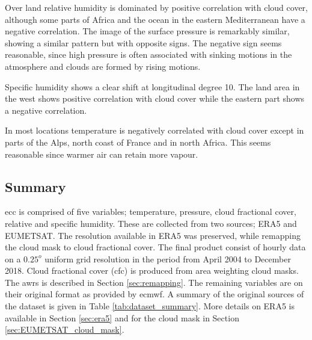Over land relative humidity is dominated by positive correlation with cloud cover, although some parts of Africa and the ocean in the eastern Mediterranean have a negative correlation. The image of the surface pressure is remarkably similar, showing a similar pattern but with opposite signs. The negative sign seems reasonable, since high pressure is often associated with sinking motions in the atmosphere and clouds are formed by rising motions. 

Specific humidity shows a clear shift at longitudinal degree 10. The land area in the west shows positive correlation with cloud cover while the eastern part shows a negative correlation. 

In most locations temperature is negatively correlated with cloud cover except in parts of the Alps, north coast of France and in north Africa. This seems reasonable since warmer air can retain more vapour.%

\subsection{Summary}
\acrshort{ecc} is comprised of five variables; temperature, pressure, cloud fractional cover, relative and specific humidity. These are collected from two sources; ERA5 and EUMETSAT. The resolution available in ERA5 was preserved, while remapping the cloud mask to cloud fractional cover. 
The final product consist of %
hourly data on a $0.25^o$ uniform grid resolution in the period from April 2004 to December 2018. Cloud fractional cover (\acrshort{cfc}) is produced from area weighting cloud masks. The \acrshort{awrs} is described in Section \ref{sec:remapping}. The remaining variables are on their original format as provided by \acrfull{ecmwf}. A summary of the original sources of the dataset is given in Table \ref{tab:dataset_summary}. More details on ERA5 is available in Section \ref{sec:era5} and for the cloud mask in Section \ref{sec:EUMETSAT_cloud_mask}. 

